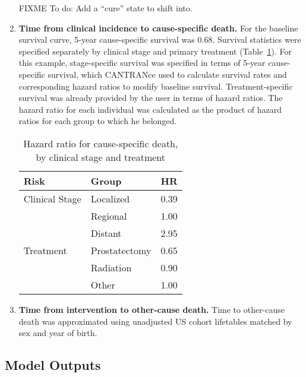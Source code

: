 \documentclass[11pt]{article}
\begin{document}
\begin{enumerate}
    FIXME To do: Add a ``cure'' state to shift into.

    \item \textbf{Time from clinical incidence to cause-specific death.} For the baseline survival curve, 5-year cause-specific survival was 0.68.
        Survival statistics were specified separately by clinical stage and primary treatment (Table~\ref{tab:morthrs}).
        For this example, stage-specific survival was specified in terms of 5-year cause-specific survival, which CANTRANce used to calculate survival rates and corresponding hazard ratios to modify baseline survival.
        Treatment-specific survival was already provided by the user in terms of hazard ratios.
        The hazard ratio for each individual was calculated as the product of hazard ratios for each group to which he belonged.


\begin{table}[!ht]
\centering
\begin{tabular}{llc}
  \hline
Risk & Group & HR \\ 
  \hline
Clinical Stage & Localized & 0.39 \\ 
   & Regional & 1.00 \\ 
   & Distant & 2.95 \\ 
  Treatment & Prostatectomy & 0.65 \\ 
   & Radiation & 0.90 \\ 
   & Other & 1.00 \\ 
   \hline
\end{tabular}
\caption{Hazard ratio for cause-specific death, by clinical stage and treatment} 
\label{tab:morthrs}
\end{table}
    \item \textbf{Time from intervention to other-cause death.} Time to other-cause death was approximated using unadjusted US cohort lifetables matched by sex and year of birth.

\end{enumerate}

\subsection{Model Outputs}
\end{document}
